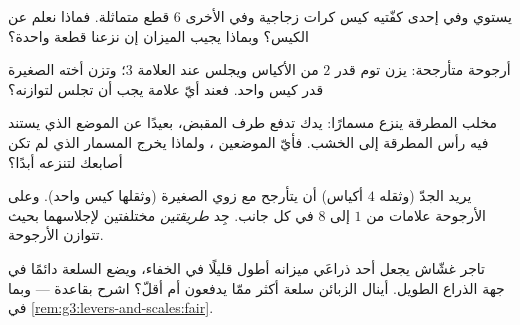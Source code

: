 \begin{exercise}[$\star$]\label{exo:g3:levers-and-scales:7}
يستوي  وفي إحدى كفّتيه كيس كرات زجاجية وفي الأخرى
$6$ قطع متماثلة. فماذا نعلم عن الكيس؟ وبماذا يجيب الميزان إن
نزعنا قطعة واحدة؟
\end{exercise}

\begin{exercise}[$\star$]\label{exo:g3:levers-and-scales:8}
أرجوحة متأرجحة: يزن توم قدر $2$ من الأكياس ويجلس عند العلامة
$3$؛ وتزن أخته الصغيرة قدر كيس واحد. فعند أيّ علامة يجب أن تجلس
لتوازنه؟
\end{exercise}

\begin{exercise}[$\star$]\label{exo:g3:levers-and-scales:9}
مخلب المطرقة ينزع مسمارًا: يدك تدفع طرف المقبض، بعيدًا عن الموضع
الذي يستند فيه رأس المطرقة إلى الخشب. فأيّ الموضعين ، ولماذا يخرج المسمار الذي لم تكن أصابعك لتنزعه أبدًا؟
\end{exercise}

\begin{exercise}[$\star\star$]\label{exo:g3:levers-and-scales:10}
يريد الجدّ (وثقله $4$ أكياس) أن يتأرجح مع زوي الصغيرة (وثقلها
كيس واحد). وعلى الأرجوحة علامات من $1$ إلى $8$ في كل جانب. جِد
\emph{طريقتين} مختلفتين لإجلاسهما بحيث تتوازن الأرجوحة.
\end{exercise}

\begin{exercise}[$\star\star$]\label{exo:g3:levers-and-scales:11}
تاجر غشّاش يجعل أحد ذراعَي ميزانه أطول قليلًا في الخفاء، ويضع
السلعة دائمًا في جهة الذراع الطويل. أينال الزبائن سلعة أكثر ممّا
يدفعون أم أقلّ؟ اشرح بقاعدة  --- وبما في
\cref{rem:g3:levers-and-scales:fair}.
\end{exercise}

